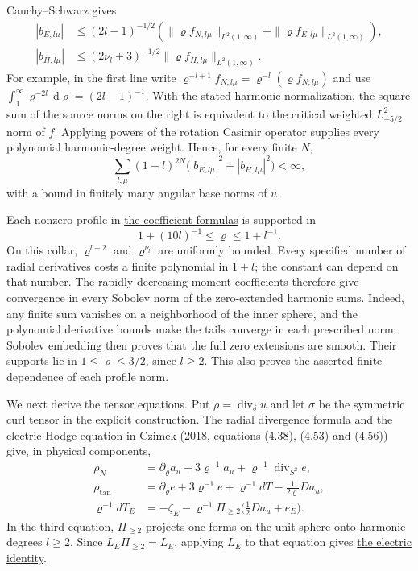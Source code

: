 \documentclass[
  english,
  11pt,
  reqno]{amsart}
\begin{document}
Cauchy--Schwarz gives%
 \[
\begin{aligned}
|b_{E,l\mu}|
 &\le(2l-1)^{-1/2}
       \left(\|\varrho f_{N,l\mu}\|_{L^2(1,\infty)}
             +\|\varrho f_{E,l\mu}\|_{L^2(1,\infty)}\right),\\
|b_{H,l\mu}|
 &\le(2\nu_l+3)^{-1/2}
                  \|\varrho f_{H,l\mu}\|_{L^2(1,\infty)}.
\end{aligned}
\] For example, in the first line write
\(\varrho^{-l+1}f_{N,l\mu}=\varrho^{-l}(\varrho f_{N,l\mu})\) and use
\(\int_1^\infty\varrho^{-2l}\,\mathrm d\varrho=(2l-1)^{-1}\). With the
stated harmonic normalization, the square sum of the source norms on the
right is equivalent to the critical weighted \(L^2_{-5/2}\) norm of
\(f\). Applying powers of the rotation Casimir operator supplies every
polynomial harmonic-degree weight. Hence, for every finite \(N\),%
 \[
\sum_{l,\mu}(1+l)^{2N}
  \bigl(|b_{E,l\mu}|^2+|b_{H,l\mu}|^2\bigr)<\infty,
\] with a bound in finitely many angular base norms of \(u\).

Each nonzero profile in
\hyperref[eq:online-momentum-profile-coefficients]{the coefficient
formulas} is supported in \[
1+(10l)^{-1}\le\varrho\le1+l^{-1}.
\] On this collar, \(\varrho^{l-2}\) and \(\varrho^{\nu_l}\) are
uniformly bounded. Every specified number of radial derivatives costs a
finite polynomial in \(1+l\); the constant can depend on that number.
The rapidly decreasing moment coefficients therefore give convergence in
every Sobolev norm of the zero-extended harmonic sums. Indeed, any
finite sum vanishes on a neighborhood of the inner sphere, and the
polynomial derivative bounds make the tails converge in each prescribed
norm. Sobolev embedding then proves that the full zero extensions are
smooth. Their supports lie in \(1\le\varrho\le3/2\), since \(l\ge2\).
This also proves the asserted finite dependence of each profile norm.

We next derive the tensor equations. Put
\(\rho=\operatorname{div}_\delta u\) and let \(\sigma\) be the symmetric
curl tensor in the explicit construction. The radial divergence formula
and the electric Hodge equation in \hyperref[ref-Czimek2018]{Czimek}
(2018, equations (4.38), (4.53) and (4.56)) give, in physical
components,%
 \[
\begin{aligned}
\rho_N
 &=\partial_\varrho a_u+3\varrho^{-1}a_u
                         +\varrho^{-1}\operatorname{div}_{S^2}e,\\
\rho_{\mathrm{tan}}
 &=\partial_\varrho e+3\varrho^{-1}e
          +\varrho^{-1}dT-\tfrac1{2\varrho}Da_u,\\
\varrho^{-1}dT_E
 &=-\zeta_E-\varrho^{-1}\Pi_{\ge2}\bigl(\tfrac12Da_u+e_E\bigr).
\end{aligned}
\] In the third equation, \(\Pi_{\ge2}\) projects one-forms on the unit
sphere onto harmonic degrees \(l\ge2\). Since \(L_E\Pi_{\ge2}=L_E\),
applying \(L_E\) to that equation gives
\hyperref[eq:online-momentum-electric-range]{the electric identity}.
\end{document}
